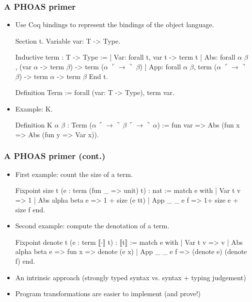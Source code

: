 \documentclass[9pt]{beamer}
\begin{document}
\begin{frame}[fragile]
  \frametitle{A PHOAS primer}
  \begin{itemize}
  \item Use Coq bindings to represent the bindings of the object language.
    \newcommand\arrow{\ulcorner \to \urcorner}
\begin{coq}
Section t. 
  Variable var: T -> Type.
  
  Inductive term : T -> Type :=
  | Var: forall t, var t -> term t
  | Abs: forall $\alpha$ $\beta$, (var $\alpha$ -> term $\beta$) -> term ($\alpha$ $\arrow$ $\beta$)
  | App: forall $\alpha$ $\beta$, term ($\alpha$ $\arrow$ $\beta$) -> term $\alpha$ -> term $\beta$
End t. 

Definition Term := forall (var: T -> Type), term var. 
\end{coq}
\item Example: K.
  \begin{coq}
Definition K $\alpha$ $\beta$ : Term ($\alpha~\arrow~\beta~\arrow~\alpha$) := fun var => 
  Abs (fun x => Abs (fun y => Var x)).
\end{coq}

\end{itemize}
\end{frame}

\begin{frame}[fragile]
  \frametitle{A PHOAS primer (cont.)}
  \begin{itemize}
  \item First example: count the size of a term.
    \begin{coq}
Fixpoint size t (e : term (fun _ => unit) t) : nat := 
match e with
| Var t v => 1
| Abs alpha beta e => 1 + size (e tt)
| App _ _ e f => 1+ size e + size f
end.
\end{coq}
\pause
\item Second example: compute the denotation of a term.
    \begin{coq}
Fixpoint denote t (e : term $\llbracket \cdot \rrbracket$ t) : $\llbracket$t$\rrbracket$ :=
match e with
| Var t v => v
| Abs alpha beta e => fun x => denote (e x)
| App _ _ e f => (denote e) (denote f)
end.
\end{coq}
\pause
\item An \alert{intrinsic approach} (strongly typed syntax vs. syntax + typing judgement)
\item Program transformations are easier to implement (and prove!) 
\\
\end{itemize}
\end{frame}
\end{document}
